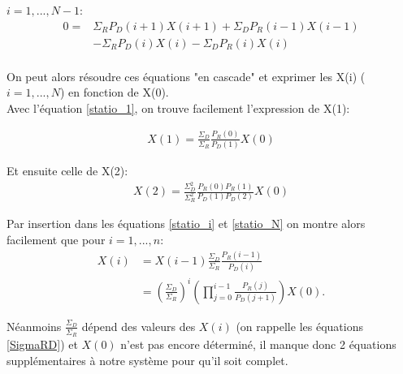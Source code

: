 $i=1,...,N-1$:
\begin{equation}
\begin{aligned}
0 =& \Sigma_R P_D(i+1) X(i+1)+ \Sigma_D P_R(i-1) X(i-1)\\ 
	&- \Sigma_R P_D(i) X(i) - \Sigma_D P_R(i) X(i)\\
\label{statio_i}
\end{aligned}
\end{equation}

On peut alors résoudre ces équations "en cascade" et exprimer les X(i) ($i=1,...,N$) en fonction de X(0).\\
Avec l'équation \ref{statio_1}, on trouve facilement l'expression de X(1):

\begin{equation}
\begin{aligned}
X(1) = \frac{\Sigma_D}{\Sigma_R} \frac{P_R(0)}{P_D(1)} X(0)
\end{aligned}
\end{equation}

Et ensuite celle de X(2):
\begin{equation}
\begin{aligned}
X(2) = \frac{\Sigma^2_D}{\Sigma^2_R} \frac{P_R(0)P_R(1)}{P_D(1)P_D(2)} X(0)
\end{aligned}
\end{equation}

Par insertion dans les équations \ref{statio_i} et \ref{statio_N} on montre alors facilement que pour $i = 1,...,n$:
\begin{equation}
\begin{aligned}
X(i)&= X(i-1) \frac{\Sigma_D}{\Sigma_R} \frac{P_R(i-1)}{P_D(i)}  \\ 
	&= (\frac{\Sigma_D}{\Sigma_R})^i (\prod_{j=0}^{i-1} \frac{P_R(j)}{P_D(j+1)}) X(0).
\label{expression_Xi}
\end{aligned}
\end{equation}

Néanmoins $\frac{\Sigma_D}{\Sigma_R}$ dépend des valeurs des $X(i)$ (on rappelle les équations \ref{SigmaRD}) et $X(0)$ n'est pas encore déterminé, il manque donc 2 équations supplémentaires à notre système pour qu'il soit complet.\\

